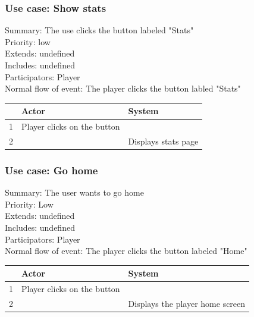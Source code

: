 \documentclass{article}
\begin{document}
\subsubsection{Use case: Show stats}
Summary: The use clicks the button labeled "Stats"\\
Priority: low\\
Extends: undefined\\
Includes: undefined\\
Participators: Player\\
Normal flow of event: The player clicks the button labled "Stats"\\
\begin{tabular}{|c|l|l|} \hline
      & Actor & System \\ \hline
    1 & Player clicks on the button & \\ \hline
    2 & & Displays stats page \\ \hline
\end{tabular} 

\subsubsection{Use case: Go home}
Summary: The user wants to go home\\
Priority: Low \\
Extends: undefined\\
Includes: undefined\\
Participators: Player \\
Normal flow of event: The player clicks the button labeled "Home"\\
\begin{tabular}{|c|l|l|} \hline
      & Actor & System \\ \hline
    1 & Player clicks on the button & \\ \hline
    2 & & Displays the player home screen \\ \hline
\end{tabular} 
\end{document}
